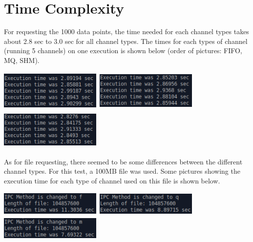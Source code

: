 \documentclass[12pt]{article}
\begin{document}
\section{Time Complexity}

For requesting the 1000 data points, the time needed for each channel types takes about 2.8 sec to 3.0 sec for all channel types. The times for each types of channel (running 5 channels) on one execution is shown below (order of pictures: FIFO, MQ, SHM). 

\begin{center}
\includegraphics[width=5cm, height=2cm]{F_Time}\,
\includegraphics[width=5cm, height=2cm]{Q_Time}\,
\includegraphics[width=5cm, height=2cm]{M_Time}
\end{center}

As for file requesting, there seemed to be some differences between the different channel types. For this test, a 100MB file was used. Some pictures showing the execution time for each type of channel used on this file is shown below.

\begin{center}
\includegraphics[width=5cm, height=1.2cm]{F_File}\,
\includegraphics[width=5cm, height=1.2cm]{Q_File}\,
\includegraphics[width=5cm, height=1.2cm]{M_File}
\end{center}
\end{document}
